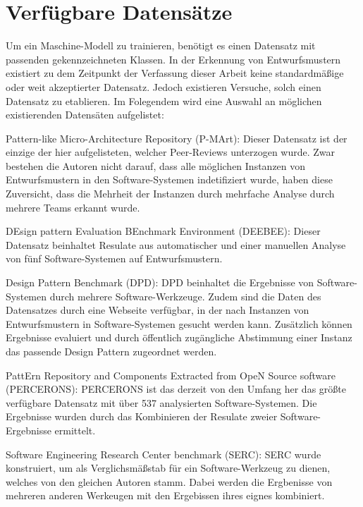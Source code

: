 \section{Verfügbare Datensätze}
Um ein Maschine-Modell zu trainieren, benötigt es einen Datensatz mit passenden gekennzeichneten Klassen.
In der Erkennung von Entwurfsmustern existiert zu dem Zeitpunkt der Verfassung dieser Arbeit keine standardmäßige oder weit akzeptierter Datensatz.
Jedoch existieren Versuche, solch einen Datensatz zu etablieren. Im Folegendem wird eine Auswahl an möglichen existierenden Datensäten aufgelistet:

\begin{description}
    \item Pattern-like Micro-Architecture Repository (P-MArt): Dieser Datensatz ist der einzige der hier aufgelisteten, welcher Peer-Reviews unterzogen wurde. Zwar bestehen die Autoren nicht darauf, dass alle möglichen Instanzen von Entwurfsmustern in den Software-Systemen indetifiziert wurde, haben diese Zuversicht, dass die Mehrheit der Instanzen durch mehrfache Analyse durch mehrere Teams erkannt wurde. 
    \item DEsign pattern Evaluation BEnchmark Environment (DEEBEE): Dieser Datensatz beinhaltet Resulate aus automatischer und einer manuellen Analyse von fünf Software-Systemen auf Entwurfsmustern.
    \item Design Pattern Benchmark (DPD): DPD beinhaltet die Ergebnisse von Software-Systemen durch mehrere Software-Werkzeuge. Zudem sind die Daten des Datensatzes durch eine Webseite verfügbar, in der nach Instanzen von Entwurfsmustern in Software-Systemen gesucht werden kann. Zusätzlich können Ergebnisse evaluiert und durch öffentlich zugängliche Abstimmung einer Instanz das passende Design Pattern zugeordnet werden.
    \item PattErn Repository and Components Extracted from OpeN Source software (PERCERONS): PERCERONS ist das derzeit von den Umfang her das größte verfügbare Datensatz mit über 537 analysierten Software-Systemen. Die Ergebnisse wurden durch das Kombinieren der Resulate zweier Software-Ergebnisse ermittelt.
    \item Software Engineering Research Center benchmark (SERC): SERC wurde konstruiert, um als Verglichsmäßstab für ein Software-Werkzeug zu dienen, welches von den gleichen Autoren stamm. Dabei werden die Ergbenisse von mehreren anderen Werkeugen mit den Ergebissen ihres eignes kombiniert.
\end{description}

